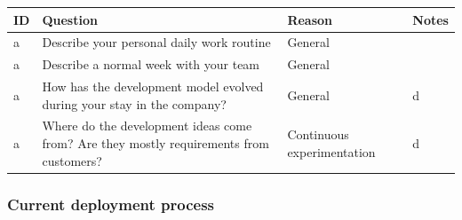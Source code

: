 \documentclass[english]{tktltiki2}
\theoremstyle{definition}
\theoremstyle{remark}
\begin{document}
\begin{center}
    \begin{tabular}{ | l | l | l | p{5cm} |}
    \hline
    ID & Question & Reason & Notes \\ \hline
    a & Describe your personal daily work routine & General & \\ \hline
    a & Describe a normal week with your team & General & \\ \hline
    a & How has the development model evolved during your stay in the company? & General & d \\ \hline
    a & Where do the development ideas come from? Are they mostly requirements from customers? & Continuous experimentation & d \\ \hline
    \hline
    \end{tabular}
\end{center}

\subsubsection{Current deployment process}
\end{document}
